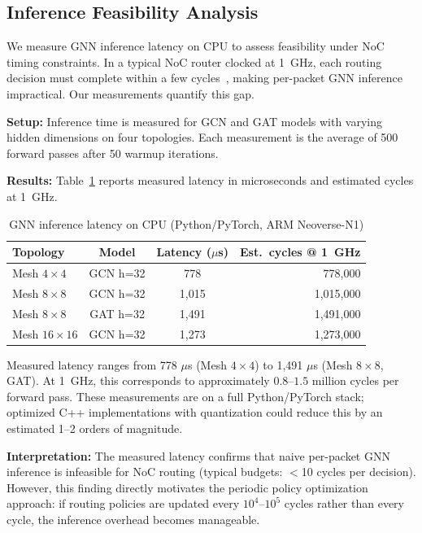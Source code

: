 \documentclass[conference]{IEEEtran}
\begin{document}
\subsection{Inference Feasibility Analysis}
\label{sec:results-latency}

We measure GNN inference latency on CPU to assess feasibility under NoC timing constraints. In a typical NoC router clocked at 1~GHz, each routing decision must complete within a few cycles~\cite{wang2022maar}, making per-packet GNN inference impractical. Our measurements quantify this gap.

\textbf{Setup:} Inference time is measured for GCN and GAT models with varying hidden dimensions on four topologies. Each measurement is the average of 500 forward passes after 50 warmup iterations.

\textbf{Results:} Table~\ref{tab:latency} reports measured latency in microseconds and estimated cycles at 1~GHz.

\begin{table}[h]
\centering
\caption{GNN inference latency on CPU (Python/PyTorch, ARM Neoverse-N1)}
\label{tab:latency}
\small
\begin{tabular}{lccr}
\toprule
\textbf{Topology} & \textbf{Model} & \textbf{Latency ($\mu$s)} & \textbf{Est.~cycles @ 1~GHz} \\
\midrule
Mesh $4\times4$ & GCN h=32 & 778 & 778,000 \\
Mesh $8\times8$ & GCN h=32 & 1,015 & 1,015,000 \\
Mesh $8\times8$ & GAT h=32 & 1,491 & 1,491,000 \\
Mesh $16\times16$ & GCN h=32 & 1,273 & 1,273,000 \\
\bottomrule
\end{tabular}
\end{table}

Measured latency ranges from 778 $\mu$s (Mesh $4\times4$) to 1,491 $\mu$s (Mesh $8\times8$, GAT). At 1~GHz, this corresponds to approximately $0.8$--$1.5$ million cycles per forward pass. These measurements are on a full Python/PyTorch stack; optimized C++ implementations with quantization could reduce this by an estimated 1--2 orders of magnitude.

\textbf{Interpretation:} The measured latency confirms that naive per-packet GNN inference is infeasible for NoC routing (typical budgets: $<$10 cycles per decision). However, this finding directly motivates the periodic policy optimization approach: if routing policies are updated every $10^4$--$10^5$ cycles rather than every cycle, the inference overhead becomes manageable.
\end{document}

